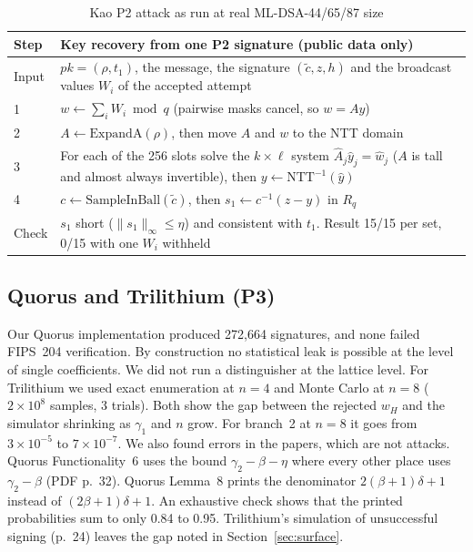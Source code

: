 \documentclass[10pt,conference,a4paper]{IEEEtran}
\newcommand{\norm}[1]{\lVert #1 \rVert_\infty}
\begin{document}
\begin{table}[t]
\caption{Kao P2 attack as run at real ML-DSA-44/65/87 size}\label{tab:kao}
\centering\scriptsize
\begin{tabularx}{\columnwidth}{@{}lX@{}}
\toprule
Step & Key recovery from one P2 signature (public data only)\\
\midrule
Input & $\mathit{pk}=(\rho,t_1)$, the message, the signature $(\tilde c,z,h)$ and the broadcast values $W_i$ of the accepted attempt\\
1 & $w\leftarrow\sum_i W_i \bmod q$ (pairwise masks cancel, so $w=Ay$)\\
2 & $A\leftarrow\mathrm{ExpandA}(\rho)$, then move $A$ and $w$ to the NTT domain\\
3 & For each of the 256 slots solve the $k\times\ell$ system $\hat A_j\hat y_j=\hat w_j$ ($A$ is tall and almost always invertible),
then $y\leftarrow\mathrm{NTT}^{-1}(\hat y)$\\
4 & $c\leftarrow\mathrm{SampleInBall}(\tilde c)$, then $s_1\leftarrow c^{-1}(z-y)$ in $R_q$\\
Check & $s_1$ short ($\norm{s_1}\le\eta$) and consistent with $t_1$. Result 15/15 per set, 0/15 with one $W_i$ withheld\\
\bottomrule
\end{tabularx}
\end{table}

\subsection{Quorus and Trilithium (P3)}\label{sec:p3}
Our Quorus implementation produced 272{,}664 signatures, and none failed FIPS~204 verification. By construction no
statistical leak is possible at the level of single coefficients. We did not run a distinguisher at the lattice level. For
Trilithium we used exact enumeration at $n=4$ and Monte Carlo at $n=8$ ($2\times10^8$ samples, 3 trials). Both show the gap
between the rejected $w_H$ and the simulator shrinking as $\gamma_1$ and $n$ grow. For branch~2 at $n=8$ it goes from
$3\times10^{-5}$ to $7\times10^{-7}$. We also found errors in the papers, which are not attacks. Quorus Functionality~6
uses the bound $\gamma_2-\beta-\eta$ where every other place uses $\gamma_2-\beta$ (PDF p.~32). Quorus Lemma~8 prints the
denominator $2(\beta+1)\delta+1$ instead of $(2\beta+1)\delta+1$. An exhaustive check shows that the printed probabilities
sum to only 0.84 to 0.95. Trilithium's simulation of unsuccessful signing (p.~24) leaves the gap noted in
Section~\ref{sec:surface}.
\end{document}
